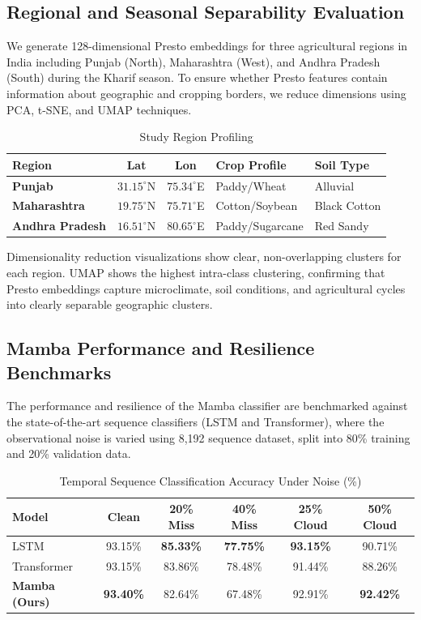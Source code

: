 \documentclass[conference]{IEEEtran}
\begin{document}
\subsection{Regional and Seasonal Separability Evaluation}
We generate 128-dimensional Presto embeddings for three agricultural regions in India including Punjab (North), Maharashtra (West), and Andhra Pradesh (South) during the Kharif season. To ensure whether Presto features contain information about geographic and cropping borders, we reduce dimensions using PCA, t-SNE, and UMAP techniques.

\begin{table}[htbp]
\caption{Study Region Profiling}
\label{tab:regions}
\centering
\begin{tabular}{lccll}
\toprule
\textbf{Region} & \textbf{Lat} & \textbf{Lon} & \textbf{Crop Profile} & \textbf{Soil Type} \\
\midrule
\textbf{Punjab} & $31.15^{\circ}$N & $75.34^{\circ}$E & Paddy/Wheat & Alluvial \\
\textbf{Maharashtra} & $19.75^{\circ}$N & $75.71^{\circ}$E & Cotton/Soybean & Black Cotton \\
\textbf{Andhra Pradesh} & $16.51^{\circ}$N & $80.65^{\circ}$E & Paddy/Sugarcane & Red Sandy \\
\bottomrule
\end{tabular}
\end{table}

Dimensionality reduction visualizations show clear, non-overlapping clusters for each region. UMAP shows the highest intra-class clustering, confirming that Presto embeddings capture microclimate, soil conditions, and agricultural cycles into clearly separable geographic clusters.

\subsection{Mamba Performance and Resilience Benchmarks}
The performance and resilience of the Mamba classifier are benchmarked against the state-of-the-art sequence classifiers (LSTM and Transformer), where the observational noise is varied using 8,192 sequence dataset, split into 80\% training and 20\% validation data.

\begin{table}[htbp]
\caption{Temporal Sequence Classification Accuracy Under Noise (\%)}
\label{tab:resilience}
\centering
\begin{tabular}{lccccc}
\toprule
\textbf{Model} & \textbf{Clean} & \textbf{20\% Miss} & \textbf{40\% Miss} & \textbf{25\% Cloud} & \textbf{50\% Cloud} \\
\midrule
LSTM & 93.15\% & \textbf{85.33\%} & \textbf{77.75\%} & \textbf{93.15\%} & 90.71\% \\
Transformer & 93.15\% & 83.86\% & 78.48\% & 91.44\% & 88.26\% \\
\textbf{Mamba (Ours)} & \textbf{93.40\%} & 82.64\% & 67.48\% & 92.91\% & \textbf{92.42\%} \\
\bottomrule
\end{tabular}
\end{table}
\end{document}
